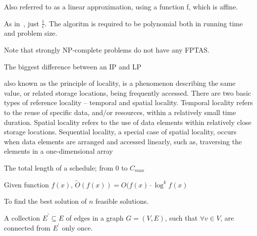 \begin{definition}[F-approximation]
    Also referred to as a linear approximation, using a function f,
    which is affine.
\end{definition}

\begin{definition}\label{FPTAS}
    As in~, just $\frac{1}{\epsilon}$.
    The algoritm is required to be polynomial both in running time and problem
    size.

    Note that strongly NP-complete problems do not have any FPTAS.
\end{definition}

\begin{definition}\label{integralitygap}
    The biggest difference between an IP and LP
\end{definition}

\begin{definition}
     also known as the principle of locality, is a phenomenon describing the
     same value, or related storage locations, being frequently accessed. There
     are two basic types of reference locality – temporal and spatial locality.
     Temporal locality refers to the reuse of specific data, and/or resources,
     within a relatively small time duration. Spatial locality refers to the
     use of data elements within relatively close storage locations. Sequential
     locality, a special case of spatial locality, occurs when data elements
     are arranged and accessed linearly, such as, traversing the elements in a
     one-dimensional array

\end{definition}

\begin{definition}[Makespan]
    The total length of a schedule; from 0 to $C_{max}$
\end{definition}

\begin{definition}[$\tilde{O}$]\label{otilde}
    Given function $f(x)$, $\tilde{O}(f(x)) = O(f(x)\cdot{\log^{k}{f(x)}}$
\end{definition}

\begin{definition}\label{optproblem}
    To find the best solution of $n$ feasible solutions.
\end{definition}

\begin{definition}
    A collection $E^{\prime} \subseteq E$ of edges in a graph 
    $G = (V,E)$, such that $\forall v \in V$, are connected 
    from $E^{\prime}$ only once.
\end{definition}


